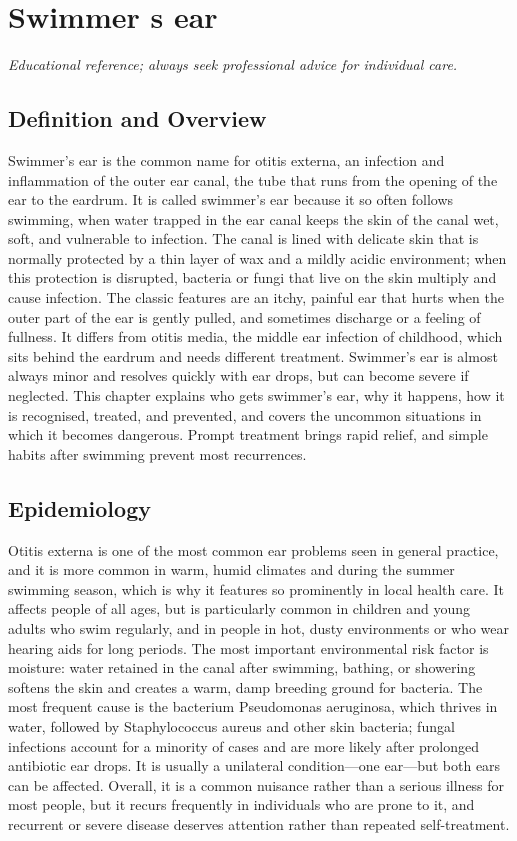 \chapter{Swimmer s ear}

\medskip
\noindent\textit{Educational reference; always seek professional advice for individual care.}

\section*{Definition and Overview}
Swimmer's ear is the common name for otitis externa, an infection and inflammation of the outer ear canal, the tube that runs from the opening of the ear to the eardrum. It is called swimmer's ear because it so often follows swimming, when water trapped in the ear canal keeps the skin of the canal wet, soft, and vulnerable to infection. The canal is lined with delicate skin that is normally protected by a thin layer of wax and a mildly acidic environment; when this protection is disrupted, bacteria or fungi that live on the skin multiply and cause infection. The classic features are an itchy, painful ear that hurts when the outer part of the ear is gently pulled, and sometimes discharge or a feeling of fullness. It differs from otitis media, the middle ear infection of childhood, which sits behind the eardrum and needs different treatment. Swimmer's ear is almost always minor and resolves quickly with ear drops, but can become severe if neglected. This chapter explains who gets swimmer's ear, why it happens, how it is recognised, treated, and prevented, and covers the uncommon situations in which it becomes dangerous. Prompt treatment brings rapid relief, and simple habits after swimming prevent most recurrences.

\section*{Epidemiology}
Otitis externa is one of the most common ear problems seen in general practice, and it is more common in warm, humid climates and during the summer swimming season, which is why it features so prominently in local health care. It affects people of all ages, but is particularly common in children and young adults who swim regularly, and in people in hot, dusty environments or who wear hearing aids for long periods. The most important environmental risk factor is moisture: water retained in the canal after swimming, bathing, or showering softens the skin and creates a warm, damp breeding ground for bacteria. The most frequent cause is the bacterium Pseudomonas aeruginosa, which thrives in water, followed by Staphylococcus aureus and other skin bacteria; fungal infections account for a minority of cases and are more likely after prolonged antibiotic ear drops. It is usually a unilateral condition---one ear---but both ears can be affected. Overall, it is a common nuisance rather than a serious illness for most people, but it recurs frequently in individuals who are prone to it, and recurrent or severe disease deserves attention rather than repeated self-treatment.

